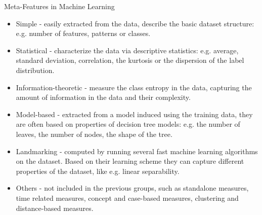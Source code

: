 \begin{frame}[c]{Meta-Features in Machine Learning}

\begin{itemize}
	\item \alert{Simple} - easily extracted from the data, describe the basic dataset structure: e.g. number of features, patterns or classes. \pause
	
	\item \alert{Statistical} - characterize the data via descriptive statistics: e.g. average, standard deviation, correlation, the kurtosis or the dispersion of the label distribution. \pause
	
	\item \alert{Information-theoretic} - measure the class entropy in the data, capturing the amount of information in the data and their complexity. \pause 
    
    \item \alert{Model-based} - extracted from a model induced using the training data, they are often based on properties of decision tree models: e.g. the number of leaves, the number of nodes, the shape of the tree. \pause
		
	\item \alert{Landmarking} - computed by running several fast machine learning algorithms on the dataset. Based on their learning scheme they can capture different properties of the dataset, like e.g. linear separability. \pause
	
	\item \alert{Others} - not included in the previous groups, such as standalone measures, time related measures, concept and case-based measures, clustering and distance-based measures.
	
\end{itemize}

\end{frame}

